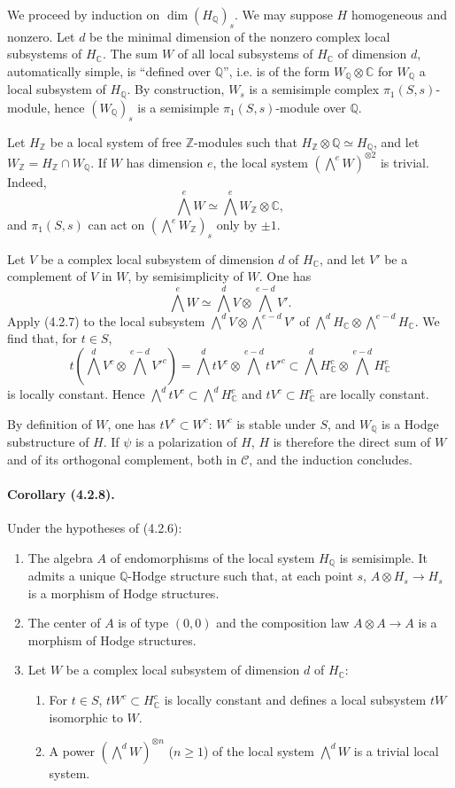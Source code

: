 \documentclass[10pt]{article}
\newcommand{\C}{\mathbb C}
\newcommand{\Q}{\mathbb Q}
\newcommand{\Z}{\mathbb Z}
\begin{document}
We proceed by induction on $\dim(H_\Q)_s$. We may suppose $H$ homogeneous and nonzero. Let $d$ be the minimal dimension of the nonzero complex local subsystems of $H_\C$. The sum $W$ of all local subsystems of $H_\C$ of dimension $d$, automatically simple, is ``defined over $\Q$'', i.e. is of the form $W_\Q\otimes\C$ for $W_\Q$ a local subsystem of $H_\Q$. By construction, $W_s$ is a semisimple complex $\pi_1(S,s)$-module, hence $(W_\Q)_s$ is a semisimple $\pi_1(S,s)$-module over $\Q$.

Let $H_\Z$ be a local system of free $\Z$-modules such that $H_\Z\otimes\Q\simeq H_\Q$, and let $W_\Z=H_\Z\cap W_\Q$. If $W$ has dimension $e$, the local system $(\bigwedge^eW)^{\otimes2}$ is trivial. Indeed,
\[
\bigwedge^eW\simeq \bigwedge^eW_\Z\otimes\C,
\]
and $\pi_1(S,s)$ can act on $(\bigwedge^eW_\Z)_s$ only by $\pm1$.

Let $V$ be a complex local subsystem of dimension $d$ of $H_\C$, and let $V'$ be a complement of $V$ in $W$, by semisimplicity of $W$. One has
\[
\bigwedge^eW\simeq \bigwedge^dV\otimes\bigwedge^{e-d}V'.
\]
Apply (4.2.7) to the local subsystem $\bigwedge^dV\otimes\bigwedge^{e-d}V'$ of $\bigwedge^dH_\C\otimes\bigwedge^{e-d}H_\C$. We find that, for $t\in S$,
\[
t(\bigwedge^dV^c\otimes\bigwedge^{e-d}V'^c)=
\bigwedge^d tV^c\otimes\bigwedge^{e-d}tV'^c
\subset \bigwedge^dH_\C^c\otimes\bigwedge^{e-d}H_\C^c
\]
is locally constant. Hence $\bigwedge^d tV^c\subset\bigwedge^dH_\C^c$ and $tV^c\subset H_\C^c$ are locally constant.

By definition of $W$, one has $tV^c\subset W^c$: $W^c$ is stable under $S$, and $W_\Q$ is a Hodge substructure of $H$. If $\psi$ is a polarization of $H$, $H$ is therefore the direct sum of $W$ and of its orthogonal complement, both in $\mathcal C$, and the induction concludes.

\paragraph{Corollary (4.2.8).} Under the hypotheses of (4.2.6):
\begin{enumerate}[label=(\roman*)]
\item The algebra $A$ of endomorphisms of the local system $H_\Q$ is semisimple. It admits a unique $\Q$-Hodge structure such that, at each point $s$, $A\otimes H_s\to H_s$ is a morphism of Hodge structures.
\item The center of $A$ is of type $(0,0)$ and the composition law $A\otimes A\to A$ is a morphism of Hodge structures.
\item Let $W$ be a complex local subsystem of dimension $d$ of $H_\C$:
\begin{enumerate}[label=\alph*)]
\item For $t\in S$, $tW^c\subset H_\C^c$ is locally constant and defines a local subsystem $tW$ isomorphic to $W$.
\item A power $(\bigwedge^dW)^{\otimes n}$ ($n\ge1$) of the local system $\bigwedge^dW$ is a trivial local system.
\end{enumerate}
\end{enumerate}
\end{document}
